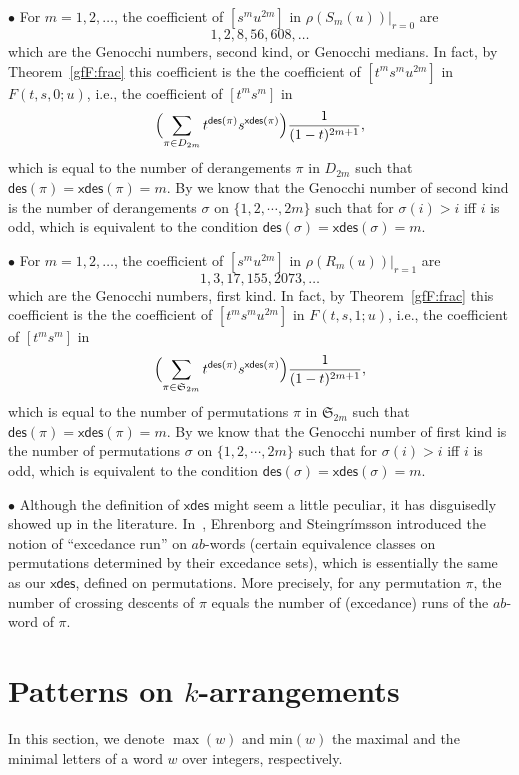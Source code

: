 \documentclass[12pt]{amsart} %
\numberwithin{equation}{section}
\theoremstyle{plain}
\theoremstyle{definition}
\def\xdes{\mathsf{xdes}}
\def\max{\mathrm{max}}
\def\min{\mathrm{min}}
\def\des{\mathsf{des}}
\def\S{\mathfrak{S}}
\def\max{\operatorname{max}}
\begin{document}
$\bullet$ For $m=1,2,\ldots$, the coefficient of $[s^m u^{2m}]$ in $\rho(S_m(u))|_{r=0}$ are
$$
1,2,8,56,608, \ldots 
$$
which are the Genocchi numbers, second kind, or Genocchi medians.
In fact, by Theorem~\ref{gfF:frac} this coefficient is the the coefficient of
$[t^m s^m u^{2m}]$ in $F(t,s,0;u)$, i.e., the coefficient of $[t^m s^m]$ in
\begin{equation*}
	\Bigl( \sum_{\pi\in D_{2m}} 
	 t^{\des(\pi)}  s^{\xdes(\pi)} \Bigr) \frac {1}{(1-t)^{2m+1}},
\end{equation*}
which is equal to the number of derangements $\pi$ in $D_{2m}$ such that $\des(\pi)=\xdes(\pi)=m$. By \cite{Dumont1994Rand} we know that the Genocchi number of second kind 
is the number of derangements $\sigma$ on $\{1,2,\cdots, 2m\}$ such that 
for $\sigma(i)>i$ iff $i$ is odd, which is equivalent to the condition $\des(\sigma)=\xdes(\sigma)=m$.

\medskip

$\bullet$ For $m=1,2,\ldots$, the coefficient of $[s^m u^{2m}]$ in 
$\rho(R_m(u))|_{r=1}$ are
$$
1,3,17,155,2073, \ldots 
$$
which are the Genocchi numbers, first kind. In fact, 
by Theorem~\ref{gfF:frac} this coefficient is the the coefficient of
$[t^m s^m u^{2m}]$ in $F(t,s,1;u)$, i.e., the coefficient of $[t^m s^m]$ in
\begin{equation*}
	\Bigl( \sum_{\pi\in \S_{2m}} 
	 t^{\des(\pi)}  s^{\xdes(\pi)} \Bigr) \frac {1}{(1-t)^{2m+1}},
\end{equation*}
which is equal to the number of permutations $\pi$ in $\S_{2m}$ such that $\des(\pi)=\xdes(\pi)=m$. By \cite{Dumont1974,Dumont1994Rand} we know that the Genocchi number of first kind 
is the number of permutations $\sigma$ on $\{1,2,\cdots, 2m\}$ such that 
for $\sigma(i)>i$ iff $i$ is odd, which is equivalent to the condition $\des(\sigma)=\xdes(\sigma)=m$.
\medskip

$\bullet$ Although the definition of $\xdes$ might seem a little peculiar, it has disguisedly showed up in the literature. In~\cite[Def.~4.1]{es}, Ehrenborg and Steingr\'imsson introduced the notion of ``excedance run'' on $ab$-words (certain equivalence classes on permutations determined by their excedance sets), which is essentially the same as our $\xdes$, defined on permutations. More precisely, for any permutation $\pi$, the number of crossing descents of $\pi$ equals the number of (excedance) runs of the $ab$-word of $\pi$.


\section{Patterns on \texorpdfstring{$k$-arrangements}{k-arrangements}}%
\label{sec:5}
In this section, we denote $\max(w)$ and $\min(w)$ the maximal and the minimal letters of a word $w$ over integers, respectively.
\end{document}
